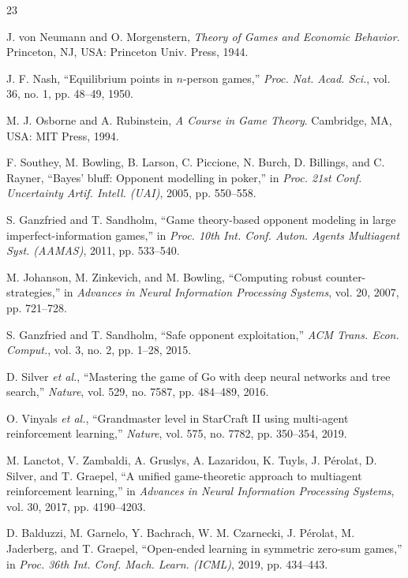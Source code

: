 \documentclass[journal]{IEEEtran}
\begin{document}
\begin{thebibliography}{23}

J. von Neumann and O. Morgenstern, \emph{Theory of Games and Economic Behavior}. Princeton, NJ, USA: Princeton Univ. Press, 1944.

J. F. Nash, ``Equilibrium points in $n$-person games,'' \emph{Proc. Nat. Acad. Sci.}, vol. 36, no. 1, pp. 48--49, 1950.

M. J. Osborne and A. Rubinstein, \emph{A Course in Game Theory}. Cambridge, MA, USA: MIT Press, 1994.

F. Southey, M. Bowling, B. Larson, C. Piccione, N. Burch, D. Billings, and C. Rayner, ``Bayes' bluff: Opponent modelling in poker,'' in \emph{Proc. 21st Conf. Uncertainty Artif. Intell. (UAI)}, 2005, pp. 550--558.

S. Ganzfried and T. Sandholm, ``Game theory-based opponent modeling in large imperfect-information games,'' in \emph{Proc. 10th Int. Conf. Auton. Agents Multiagent Syst. (AAMAS)}, 2011, pp. 533--540.

M. Johanson, M. Zinkevich, and M. Bowling, ``Computing robust counter-strategies,'' in \emph{Advances in Neural Information Processing Systems}, vol. 20, 2007, pp. 721--728.

S. Ganzfried and T. Sandholm, ``Safe opponent exploitation,'' \emph{ACM Trans. Econ. Comput.}, vol. 3, no. 2, pp. 1--28, 2015.

D. Silver \emph{et al.}, ``Mastering the game of Go with deep neural networks and tree search,'' \emph{Nature}, vol. 529, no. 7587, pp. 484--489, 2016.

O. Vinyals \emph{et al.}, ``Grandmaster level in StarCraft II using multi-agent reinforcement learning,'' \emph{Nature}, vol. 575, no. 7782, pp. 350--354, 2019.

M. Lanctot, V. Zambaldi, A. Gruslys, A. Lazaridou, K. Tuyls, J. P\'erolat, D. Silver, and T. Graepel, ``A unified game-theoretic approach to multiagent reinforcement learning,'' in \emph{Advances in Neural Information Processing Systems}, vol. 30, 2017, pp. 4190--4203.

D. Balduzzi, M. Garnelo, Y. Bachrach, W. M. Czarnecki, J. P\'erolat, M. Jaderberg, and T. Graepel, ``Open-ended learning in symmetric zero-sum games,'' in \emph{Proc. 36th Int. Conf. Mach. Learn. (ICML)}, 2019, pp. 434--443.


\end{thebibliography}
\end{document}
